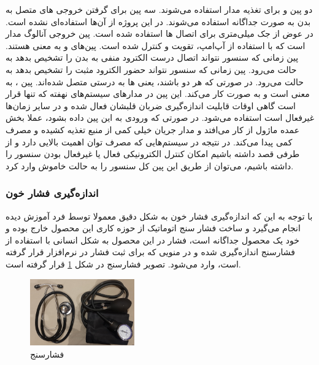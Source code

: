 دو پین  و  برای تغذیه مدار استفاده می‌شوند.  سه پین  برای گرفتن خروجی های متصل به بدن به صورت جداگانه استفاده می‌شوند. در این پروژه از آن‌ها استفاده‌ای نشده است. در عوض از جک  میلی‌متری برای اتصال ها استفاده شده است. پین  خروجی آنالوگ مدار است که با استفاده از آپ‌امپ، تقویت و کنترل شده است. پین‌های 
و
به معنی  هستند. پین  زمانی که سنسور نتواند اتصال درست الکترود منفی به بدن را تشخیص بدهد به حالت  می‌رود. پین  زمانی که سنسور نتواند حضور الکترود مثبت را تشخیص بدهد به حالت  می‌رود. در صورتی که هر دو  باشند، یعنی ها به درستی متصل شده‌اند.
پین ، به معنی  است و به صورت  کار می‌کند. این پین در مدارهای سیستم‌های نهفته که تنها قرار است گاهی اوقات قابلیت اندازه‌گیری ضربان قلبشان فعال شده و در سایر زمان‌ها غیرفعال است استفاده می‌شود. در صورتی که ورودی  به این پین داده بشود، عملا بخش عمده ماژول از کار می‌افتد و مدار جریان خیلی کمی از منبع تغذیه کشیده و مصرف کمی پیدا می‌کند. در نتیجه در سیستم‌هایی که مصرف توان اهمیت بالایی دارد و از طرفی قصد داشته باشیم امکان کنترل الکترونیکی فعال یا غیرفعال بودن سنسور را داشته باشیم، می‌توان از طریق این پین کل سنسور را به حالت خاموش وارد کرد.

\subsubsection{انداز‌ه‌گیری فشار خون }

با توجه به این که اندازه‌گیری فشار خون به شکل دقیق معمولا توسط فرد آموزش دیده انجام می‌گیرد و ساخت فشار سنج اتوماتیک از حوزه کاری این محصول خارج بوده و خود یک محصول جداگانه است، فشار در این محصول به شکل انسانی با استفاده از فشارسنج اندازه‌گیری شده و در منویی که برای ثبت فشار در نرم‌افزار قرار گرفته است، وارد می‌شود. تصویر فشارسنج در شکل \ref{fig:12} قرار گرفته است.



\begin{figure}[ht!]
	\centering
	\includegraphics[width=0.4\textwidth]{figs/cuff.jpg}
	
	\caption{فشارسنج}
	\label{fig:12}
\end{figure}

